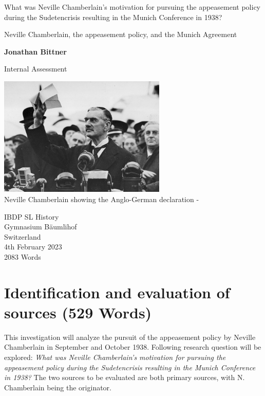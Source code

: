 \documentclass[10pt, a4papert, hidelinks]{article}
\begin{document}
\begin{titlepage}
	\begin{center}
		\vspace*{1cm}
 
		What was Neville Chamberlain's motivation for pursuing the appeasement policy during the Sudetencrisis resulting in the Munich Conference in 1938?
 
		\vspace{0.5cm}
		Neville Chamberlain, the appeasement policy, and the Munich Agreement
			 
		\vspace{1.5cm}
 
		\textbf{Jonathan Bittner}
			 
		Internal Assessment
			 
		\vfill

		\includegraphics[width=0.6\textwidth]{TITLE_IMG.jpg}\\ Neville Chamberlain showing the Anglo-German declaration - \cite{munich_agreement_1938}

		\vfill
			 
		IBDP SL History\\
		Gymnasium Bäumlihof\\
		Switzerland\\
		4th February 2023\\
		2083 Words
			 
	\end{center}
 \end{titlepage}

\tableofcontents
\newpage

\section{Identification and evaluation of sources (529 Words)} %

This investigation will analyze the pursuit of the appeasement policy by Neville Chamberlain in September and October 1938. Following research question will be explored: \emph{What was Neville Chamberlain's motivation for pursuing the appeasement policy during the Sudetencrisis resulting in the Munich Conference in 1938?} The two sources to be evaluated are both primary sources, with N. Chamberlain being the originator.
\end{document}
